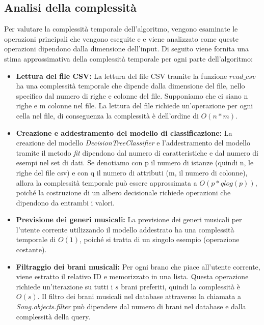 \newpage
\subsection{Analisi della complessità}
Per valutare la complessità temporale dell'algoritmo, vengono esaminate le operazioni principali che 
vengono eseguite e e viene analizzato come queste operazioni dipendono dalla dimensione dell'input. 
Di seguito viene fornita una stima approssimativa della complessità temporale per ogni parte dell'algoritmo:

\begin{itemize}
    \item \textbf{Lettura del file CSV:} La lettura del file CSV tramite la funzione $read\_csv$ ha una 
    complessità temporale che dipende dalla dimensione del file, nello specifico dal numero di righe e colonne del file.
    Supponiamo che ci siano n righe e m colonne nel file. La lettura del file richiede un'operazione 
    per ogni cella nel file, di conseguenza la complessità è dell'ordine di ${O(n*m)}$.
    \item \textbf{Creazione e addestramento del modello di classificazione:} La creazione del modello 
    \textit{DecisionTreeClassifier} e l'addestramento del modello tramite il metodo \textit{fit} dipendono dal numero di 
    caratteristiche e dal numero di esempi nel set di dati. Se denotiamo con p il numero di istanze (quindi n, le righe del file csv) 
    e con q il numero di attributi (m, il numero di colonne), allora la complessità temporale può essere approssimata a $O(p * q log(p))$, 
    poiché la costruzione di un albero decisionale richiede operazioni che dipendono da entrambi i valori.
    \item \textbf{Previsione dei generi musicali:} La previsione dei generi musicali per 
    l'utente corrente utilizzando il modello addestrato ha una complessità temporale di 
    $O(1)$, poiché si tratta di un singolo esempio (operazione costante).
    \item \textbf{Filtraggio dei brani musicali:} Per ogni brano che piace all'utente corrente, viene estratto il relativo
     ID e memorizzato in una lista. Questa operazione richiede un'iterazione su tutti i $s$ brani preferiti, quindi la 
     complessità è $O(s)$.
     Il filtro dei brani musicali nel database attraverso la chiamata 
    a \textit{Song.objects.filter} può dipendere dal numero di brani nel database e dalla complessità della query. 

\end{itemize}
